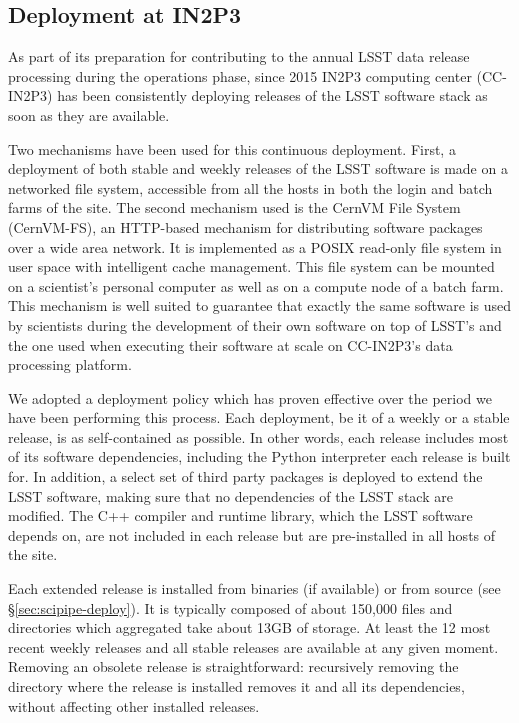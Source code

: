 \subsection{Deployment at IN2P3}

As part of its preparation for contributing to the annual LSST data release processing during the operations phase, since 2015 IN2P3 computing center (CC-IN2P3) has been consistently deploying releases of the LSST software stack as soon as they are available.

Two mechanisms have been used for this continuous deployment. First, a deployment of both stable and weekly releases of the LSST software is made on a networked file system, accessible from all the hosts in both the login and batch farms of the site. The second mechanism used is the CernVM File System (CernVM-FS)\cite{1742-6596-331-4-042003}, an HTTP-based mechanism for distributing software packages over a wide area network. It is implemented as a POSIX read-only file system in user space with intelligent cache management. This file system can be mounted on a scientist's personal computer as well as on a compute node of a batch farm. This mechanism is well suited to guarantee that exactly the same software is used by scientists during the development of their own software on top of LSST's and the one used when executing their software at scale on CC-IN2P3's data processing platform.

We adopted a deployment policy which has proven effective over the period we have been performing this process. Each deployment, be it of a weekly or a stable release, is as self-contained as possible. In other words, each release includes most of its software dependencies, including the Python interpreter each release is built for. In addition, a select set of third party packages is deployed to extend the LSST software, making sure that no dependencies of the LSST stack are modified. The C++ compiler and runtime library, which the LSST software depends on, are not included in each release but are pre-installed in all hosts of the site.

Each extended release is installed from binaries (if available) or from source (see \S\ref{sec:scipipe-deploy}). It is typically composed of about 150,000 files and directories which aggregated take about 13GB of storage. At least the 12 most recent weekly releases and all stable releases are available at any given moment. Removing an obsolete release is straightforward: recursively removing the directory where the release is installed removes it and all its dependencies, without affecting other installed releases.

